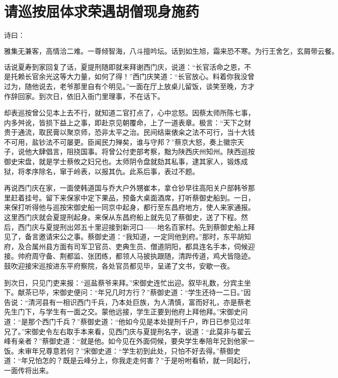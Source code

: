 

\chapter{请巡按屈体求荣\KG 遇胡僧现身施药}


诗曰：

\[
雅集无兼客，高情洽二难。一尊倾智海，八斗擅吟坛。
话到如生旭，霜来恐不寒。为行王舍乞，玄屑带云餐。
\]

话说夏寿到家回复了话，夏提刑随即就来拜谢西门庆，说道：“长官活命之恩，不是托赖长官余光这等大力量，如何了得！”西门庆笑道：“长官放心。料着你我没曾过为，随他说去，老爷那里自有个明见。”一面在厅上放桌儿留饭，谈笑至晚，方才作辞回家。到次日，依旧入衙门里理事，不在话下。

却表巡按曾公见本上去不行，就知道二官打点了，心中忿怒。因蔡太师所陈七事，内多舛讹，皆损下益上之事，即赴京见朝覆命，上了一道表章。极言：“天下之财贵于通流，取民膏以聚京师，恐非太平之治。民间结粜俵籴之法不可行，当十大钱不可用，盐钞法不可屡更。臣闻民力殚矣，谁与守邦？”蔡京大怒，奏上徽宗天子，说他大肆倡言，阻挠国事。将曾公付吏部考察，黜为陕西庆州知州。陕西巡按御史宋盘，就是学士蔡攸之妇兄也。太师阴令盘就劾其私事，逮其家人，锻炼成狱，将孝序除名，窜于岭表，以报其仇。此系后事，表过不题。

再说西门庆在家，一面使韩道国与乔大户外甥崔本，拿仓钞早往高阳关户部韩爷那里赶着挂号。留下来保家中定下果品，预备大桌面酒席，打听蔡御史船到。一日，来保打听得他与巡按宋御史船一同京中起身，都行至东昌府地方，使人来家通报。这里西门庆就会夏提刑起身。来保从东昌府船上就先见了蔡御史，送了下程。然后，西门庆与夏提刑出郊五十里迎接到新河口——地名百家村。先到蔡御史船上拜见了，备言邀请宋公之事。蔡御史道：“我知道，一定同他到府。”那时，东平胡知府，及合属州县方面有司军卫官员、吏典生员、僧道阴阳，都具连名手本，伺候迎接。帅府周守备、荆都监、张团练，都领人马披执跟随，清跸传道，鸡犬皆隐迹。鼓吹迎接宋巡按进东平府察院，各处官员都见毕，呈递了文书，安歇一夜。

到次日，只见门吏来报：“巡盐蔡爷来拜。”宋御史连忙出迎。叙毕礼数，分宾主坐下。献茶已毕，宋御史便问：“年兄几时方行？”蔡御史道：“学生还待一二日。”因告说：“清河县有一相识西门千兵，乃本处巨族，为人清慎，富而好礼，亦是蔡老先生门下，与学生有一面之交。蒙他远接，学生正要到他府上拜他拜。”宋御史问道：“是那个西门千兵？”蔡御史道：“他如今见是本处提刑千户，昨日已参见过年兄了。”宋御史令左右取手本来看，见西门庆与夏提刑名字，说道：“此莫非与翟云峰有亲者？”蔡御史道：“就是他。如今见在外面伺候，要央学生奉陪年兄到他家一饭。未审年兄尊意若何？”宋御史道：“学生初到此处，只怕不好去得。”蔡御史道：“年兄怕怎的？既是云峰分上，你我走走何害？”于是吩咐看轿，就一同起行，一面传将出来。

